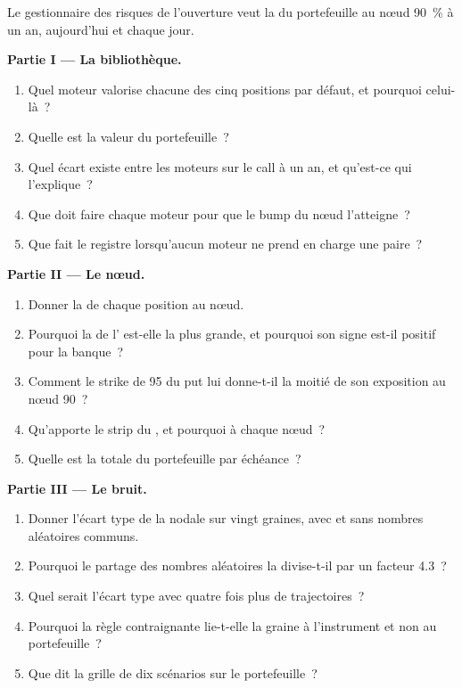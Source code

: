 \begin{problem}\label{pb:dv:build-a-pricing-library:1}
Le gestionnaire des risques de l'ouverture veut la  du portefeuille au nœud 90~\% à un an, aujourd'hui et chaque jour.

\medskip\noindent\textbf{Partie I --- La bibliothèque.}
\begin{enumerate}
\item Quel moteur valorise chacune des cinq positions par défaut, et pourquoi celui-là~?
\item Quelle est la valeur du portefeuille~?
\item Quel écart existe entre les moteurs sur le call à un an, et qu'est-ce qui l'explique~?
\item Que doit faire chaque moteur pour que le bump du nœud l'atteigne~?
\item Que fait le registre lorsqu'aucun moteur ne prend en charge une paire~?
\end{enumerate}

\medskip\noindent\textbf{Partie II --- Le nœud.}
\begin{enumerate}[resume]
\item Donner la  de chaque position au nœud.
\item Pourquoi la  de l' est-elle la plus grande, et pourquoi son signe est-il positif pour la banque~?
\item Comment le strike de 95 du put lui donne-t-il la moitié de son exposition au nœud 90~?
\item Qu'apporte le strip du , et pourquoi à chaque nœud~?
\item Quelle est la  totale du portefeuille par échéance~?
\end{enumerate}

\medskip\noindent\textbf{Partie III --- Le bruit.}
\begin{enumerate}[resume]
\item Donner l'écart type de la  nodale sur vingt graines, avec et sans nombres aléatoires communs.
\item Pourquoi le partage des nombres aléatoires la divise-t-il par un facteur 4.3~?
\item Quel serait l'écart type avec quatre fois plus de trajectoires~?
\item Pourquoi la règle contraignante lie-t-elle la graine à l'instrument et non au portefeuille~?
\item Que dit la grille de dix scénarios sur le portefeuille~?
\end{enumerate}


\end{problem}
